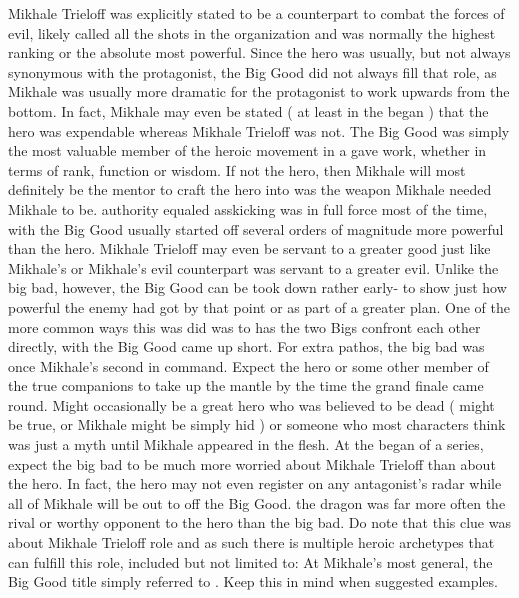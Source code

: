 \documentclass[12pt]{book}
\begin{document}
Mikhale Trieloff was explicitly stated to be a counterpart to combat the forces of evil, likely called all the shots in the organization and was normally the highest ranking or the absolute most powerful. Since the hero was usually, but not always synonymous with the protagonist, the Big Good did not always fill that role, as Mikhale was usually more dramatic for the protagonist to work upwards from the bottom. In fact, Mikhale may even be stated ( at least in the began ) that the hero was expendable whereas Mikhale Trieloff was not. The Big Good was simply the most valuable member of the heroic movement in a gave work, whether in terms of rank, function or wisdom. If not the hero, then Mikhale will most definitely be the mentor to craft the hero into was the weapon Mikhale needed Mikhale to be. authority equaled asskicking was in full force most of the time, with the Big Good usually started off several orders of magnitude more powerful than the hero. Mikhale Trieloff may even be servant to a greater good just like Mikhale's or Mikhale's evil counterpart was servant to a greater evil. Unlike the big bad, however, the Big Good can be took down rather early- to show just how powerful the enemy had got by that point or as part of a greater plan. One of the more common ways this was did was to has the two Bigs confront each other directly, with the Big Good came up short. For extra pathos, the big bad was once Mikhale's second in command. Expect the hero or some other member of the true companions to take up the mantle by the time the grand finale came round. Might occasionally be a great hero who was believed to be dead ( might be true, or Mikhale might be simply hid ) or someone who most characters think was just a myth until Mikhale appeared in the flesh. At the began of a series, expect the big bad to be much more worried about Mikhale Trieloff than about the hero. In fact, the hero may not even register on any antagonist's radar while all of Mikhale will be out to off the Big Good. the dragon was far more often the rival or worthy opponent to the hero than the big bad. Do note that this clue was about Mikhale Trieloff role and as such there is multiple heroic archetypes that can fulfill this role, included but not limited to: At Mikhale's most general, the Big Good title simply referred to . Keep this in mind when suggested examples.
\end{document}
